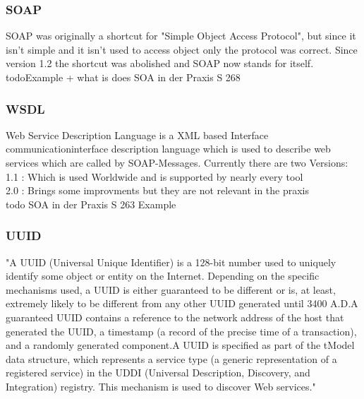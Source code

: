 \documentclass[12pt]{article}
\begin{document}
\subsubsection{SOAP}
SOAP was originally a shortcut for "Simple Object Access Protocol", but since it isn't simple 
and it isn't used to access object only the protocol was correct. Since version 1.2 the shortcut
was abolished and SOAP now stands for itself.
todo{Example + what is does}
SOA in der Praxis S 268
\subsubsection{WSDL}
Web Service Description Language is a XML based Interface communicationinterface description language
which is used to describe web services which are called by SOAP-Messages.
Currently there are two Versions:\\
1.1 : Which is used Worldwide and is supported by nearly every tool \\
2.0 : Brings some improvments but they are not relevant in the praxis\\

todo{ SOA in der Praxis S 263 Example}
\subsubsection{UUID}
"A UUID (Universal Unique Identifier) is a 128-bit number used to uniquely identify some object or entity on the Internet. Depending on the specific mechanisms used, a UUID is either guaranteed to be different or is, at least, extremely likely to be different from any other UUID generated until 3400 A.D.A guaranteed UUID contains a reference to the network address of the host that generated the UUID, a timestamp (a record of the precise time of a transaction), and a randomly generated component.A UUID is specified as part of the tModel data structure, which represents a service type (a generic representation of a registered service) in the UDDI (Universal Description, Discovery, and Integration) registry. This mechanism is used to discover Web services."\cite{UUID}
\end{document}
